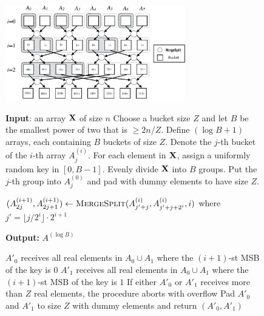 \begin{figure}[h!]
\centering

\includegraphics[width=0.7\textwidth]{RadixBucketSort1.pdf}
\label{fig:radix-sort}

\bigskip
\begin{algorithm}
\begin{algorithmic}
\State
\State \textbf{Input}: an array $\mathbf{X}$ of size $n$
\State Choose a bucket size $Z$ and let $B$ be the smallest power of two that is $\geq 2n/Z$. 
\State Define $(\log B+1)$ arrays, each containing $B$ buckets of size $Z$. Denote the $j$-th bucket of the $i$-th array $A_j^{(i)}$.
\State For each element in $\mathbf{X}$, assign a uniformly random key in $[0,B-1]$.
\State Evenly divide $\mathbf{X}$ into $B$ groups. Put the $j$-th group into $A_j^{(0)}$ and pad with dummy elements to have size $Z$.

        \State $(A^{(i+1)}_{2j}, A^{(i+1)}_{2j+1}) \leftarrow \textsc{MergeSplit}(A^{(i)}_{j'+j}, A^{(i)}_{j'+j+2^i}, i)$ where $j'=\lfloor j / {2^i} \rfloor \cdot 2^{i+1}$
        \State {}
        
    \EndFor
\EndFor    
\State \textbf{Output:} $A^{(\log B)}$

\medskip
{}
    \State $A'_0$ receives all real elements in $A_0 \cup A_1$ where the $(i+1)$-st MSB of the key is $0$   
    \State $A'_1$ receives all real elements in $A_0 \cup A_1$ where the $(i+1)$-st MSB of the key is $1$
    \State If either $A'_0$ or $A'_1$ receives more than $Z$ real elements, the procedure aborts with {\sf overflow}
    \State Pad $A'_0$ and $A'_1$ to size $Z$ with dummy elements and return $(A'_0, A'_1)$
\EndFunction   
\end{algorithmic}
\label{code:obin}
\end{algorithm}


\end{figure}
